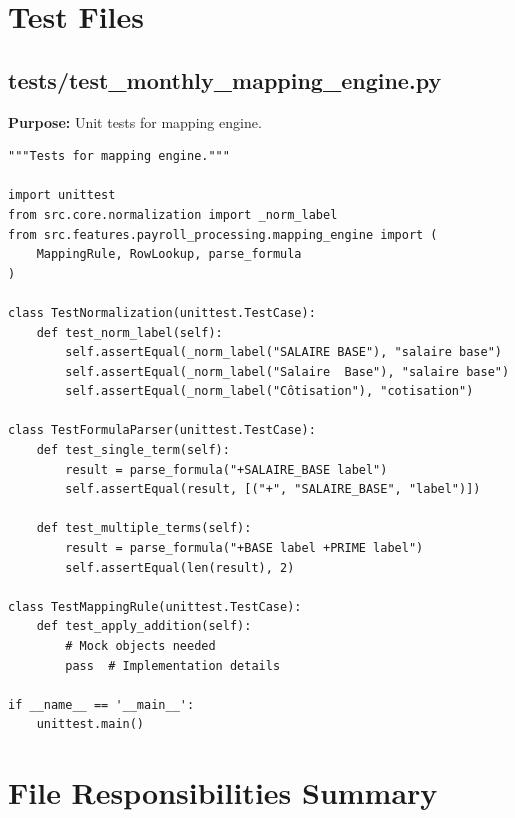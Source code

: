 \section{Test Files}

\subsection{tests/test\_monthly\_mapping\_engine.py}

\textbf{Purpose:} Unit tests for mapping engine.

\begin{lstlisting}[style=pythonstyle]
"""Tests for mapping engine."""

import unittest
from src.core.normalization import _norm_label
from src.features.payroll_processing.mapping_engine import (
    MappingRule, RowLookup, parse_formula
)

class TestNormalization(unittest.TestCase):
    def test_norm_label(self):
        self.assertEqual(_norm_label("SALAIRE BASE"), "salaire base")
        self.assertEqual(_norm_label("Salaire  Base"), "salaire base")
        self.assertEqual(_norm_label("Côtisation"), "cotisation")

class TestFormulaParser(unittest.TestCase):
    def test_single_term(self):
        result = parse_formula("+SALAIRE_BASE label")
        self.assertEqual(result, [("+", "SALAIRE_BASE", "label")])
    
    def test_multiple_terms(self):
        result = parse_formula("+BASE label +PRIME label")
        self.assertEqual(len(result), 2)

class TestMappingRule(unittest.TestCase):
    def test_apply_addition(self):
        # Mock objects needed
        pass  # Implementation details

if __name__ == '__main__':
    unittest.main()
\end{lstlisting}

\section{File Responsibilities Summary}

